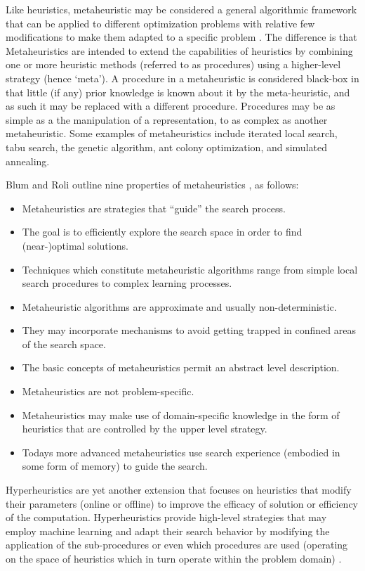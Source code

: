 Like heuristics, metaheuristic may be considered a general algorithmic framework that can be applied to different optimization problems with relative few modifications to make them adapted to a specific problem \cite{Glover2003, Talbi2009}. The difference is that Metaheuristics are intended to extend the capabilities of heuristics by combining one or more heuristic methods (referred to as procedures) using a higher-level strategy (hence `meta'). A procedure in a metaheuristic is considered black-box in that little (if any) prior knowledge is known about it by the meta-heuristic, and as such it may be replaced with a different procedure. Procedures may be as simple as a the manipulation of a representation, to as complex as another metaheuristic. Some examples of metaheuristics include iterated local search, tabu search, the genetic algorithm, ant colony optimization, and simulated annealing.

Blum and Roli outline nine properties of metaheuristics \cite{Blum2003}, as follows: 
\begin{itemize}
	\item Metaheuristics are strategies that ``guide'' the search process.
	\item The goal is to efficiently explore the search space in order to find (near-)optimal solutions.
	\item Techniques which constitute metaheuristic algorithms range from simple local search procedures to complex learning processes.
	\item Metaheuristic algorithms are approximate and usually non-deterministic.
	\item They may incorporate mechanisms to avoid getting trapped in confined areas of the search space.
	\item The basic concepts of metaheuristics permit an abstract level description.
	\item Metaheuristics are not problem-specific.
	\item Metaheuristics may make use of domain-specific knowledge in the form of heuristics that are controlled by the upper level strategy.
	\item Todays more advanced metaheuristics use search experience (embodied in some form of memory) to guide the search.
\end{itemize}

Hyperheuristics are yet another extension that focuses on heuristics that modify their parameters (online or offline) to improve the efficacy of solution or efficiency of the computation. Hyperheuristics provide high-level strategies that may employ machine learning and adapt their search behavior by modifying the application of the sub-procedures or even which procedures are used (operating on the space of heuristics which in turn operate within the problem domain) \cite{Burke2003a, Burke2003}. 


